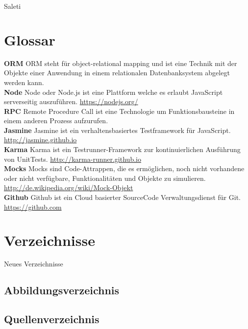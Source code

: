 Saleti

\newpage

\hypertarget{glossar}{\chapter{Glossar}\label{glossar}}

\textbf{ORM} ORM steht für object-relational mapping und ist eine
Technik mit der Objekte einer Anwendung in einem relationalen
Datenbanksystem abgelegt werden kann.\\
\textbf{Node} Node oder Node.js ist eine Plattform welche es erlaubt
JavaScript serverseitig auszuführen. \url{https://nodejs.org/}\\
\textbf{RPC} Remote Procedure Call ist eine Technologie um
Funktionsbausteine in einem anderen Prozess aufzurufen.\\
\textbf{Jasmine} Jasmine ist ein verhaltensbasiertes Testframework für
JavaScript. \url{http://jasmine.github.io}\\
\textbf{Karma} Karma ist ein Testrunner-Framework zur kontinuierlichen
Ausführung von UnitTests. \url{http://karma-runner.github.io}\\
\textbf{Mocks} Mocks sind Code-Attrappen, die es ermöglichen, noch nicht
vorhandene oder nicht verfügbare, Funktionalitäten und Objekte zu
simulieren. \url{http://de.wikipedia.org/wiki/Mock-Objekt}\\
\textbf{Github} Github ist ein Cloud basierter SourceCode
Verwaltungsdienst für Git. \url{https://github.com}

\chapter{Verzeichnisse}\label{verzeichnisse}

Neues Verzeichnisse

\section{Abbildungsverzeichnis}\label{abbildungsverzeichnis}

\renewcommand{\listfigurename}{} 

\begingroup\let\clearpage\relax
\listoffigures
\endgroup

\pagebreak

\section{Quellenverzeichnis}\label{quellenverzeichnis}

